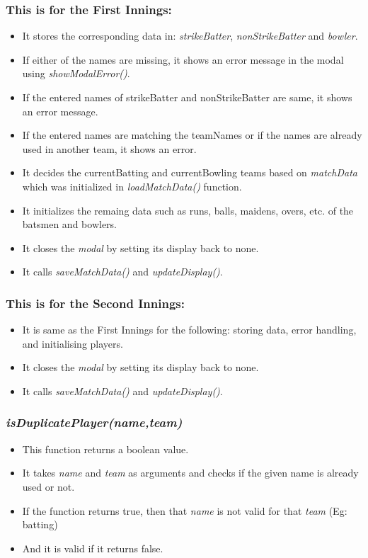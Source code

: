 \documentclass[a4paper,12pt]{article}
\begin{document}
\subsubsection*{This is for the First Innings:}
\begin{itemize}
\item It stores the corresponding data in: \textit{strikeBatter}, \textit{nonStrikeBatter} and \textit{bowler}.
\item If either of the names are missing, it shows an error message in the modal using \textit{showModalError()}.
\item If the entered names of strikeBatter and nonStrikeBatter are same, it shows an error message. 
\item If the entered names are matching the teamNames or if the names are already used in another team, it shows an error.
\item It decides the currentBatting and currentBowling teams based on \textit{matchData} which was initialized in \textit{loadMatchData()} function.
\item It initializes the remaing data such as runs, balls, maidens, overs, etc. of the batsmen and bowlers.
\item It closes the \textit{modal} by setting its display back to none.
\item It calls \textit{saveMatchData()} and \textit{updateDisplay()}.
\end{itemize} 

\subsubsection*{This is for the Second Innings:}
\begin{itemize}
\item It is same as the First Innings for the following: storing data, error handling, and initialising players.
\item It closes the \textit{modal} by setting its display back to none.
\item It calls \textit{saveMatchData()} and \textit{updateDisplay()}.
\end{itemize}

\subsubsection{\textit{isDuplicatePlayer(name,team)}}
\label{error1}
\begin{itemize}
\item This function returns a boolean value.
\item It takes \textit{name} and \textit{team} as arguments and checks if the given name is already used or not.
\item If the function returns true, then that \textit{name} is not valid for that \textit{team} (Eg: batting)
\item And it is valid if it returns false.
\end{itemize}
\end{document}

